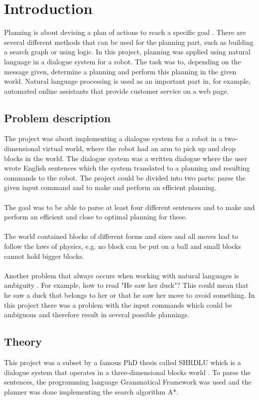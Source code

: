 \chapter{Introduction}
Planning is about devising a plan of actions to reach a specific goal
\citep{planning_ai}. There are several different methods that can be used for
the planning part, such as building a search graph or using logic. In this
project, planning was applied using natural language in a dialogue system for a
robot. The task was to, depending on the message given, determine a planning
and perform this planning in the given world. Natural language processing is
used as an important part in, for example, automated online assistants that
provide customer service on a web page. 

\section{Problem description}
The project was about implementing a dialogue system for a robot in a
two-dimensional virtual world, where the robot had an arm to pick up and drop
blocks in the world. The dialogue system was a written dialogue where the user
wrote English sentences which the system translated to a planning and resulting
commands to the robot. The project could be divided into two parts: parse the
given input command and to make and perform an efficient planning. \\\\
The goal was to be able to parse at least four different sentences and to make
and perform an efficient and close to optimal planning for these. 
\\\\
The world contained blocks of different forms and sizes and all moves had to
follow the laws of physics, e.g. no block can be put on a ball and small blocks
cannot hold bigger blocks. \\\\ Another problem that always occurs when working
with natural languages is ambiguity \citep{naturallang_ai}. For example, how to
read "He saw her duck"? This could mean that he saw a duck that belongs to her
or that he saw her move to avoid something. In this project there was a problem
with the input commands which could be ambiguous and therefore result in
several possible plannings. 

\section{Theory}
This project was a subset by a famous PhD thesis called SHRDLU which  is a
dialogue system that operates in a three-dimensional blocks world
\cite{SHRDLU_url}. To parse the sentences, the programming language Grammatical
Framework was used and the planner was done implementing the search algorithm
A*\cite{gf_url,astar_ai}.

